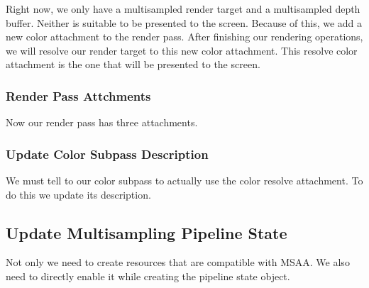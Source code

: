 Right now, we only have a multisampled render target and a multisampled
depth buffer.
Neither is suitable to be presented to the screen.
Because of this, we add a new color attachment to the render pass.
After finishing our rendering operations, we will resolve our render target to
this new color attachment.
This resolve color attachment is the one that will be presented to the screen.

\begin{minipage}{\linewidth}{\noindent}
    
\end{minipage}

\subsubsection{Render Pass Attchments}

Now our render pass has three attachments.

\begin{minipage}{\linewidth}{\noindent}
    
\end{minipage}

\subsubsection{Update Color Subpass Description}

We must tell to our color subpass to actually use the color resolve attachment.
To do this we update its description.

\begin{minipage}{\linewidth}{\noindent}
    
\end{minipage}

\subsection{Update Multisampling Pipeline State}

Not only we need to create resources that are compatible with MSAA.
We also need to directly enable it while creating the pipeline state object.

